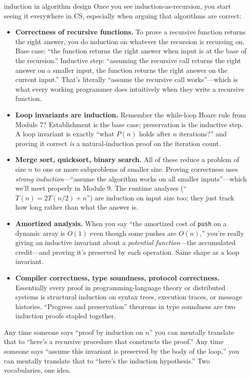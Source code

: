 \documentclass[11pt]{article}
\begin{document}
\begin{sidebar}{induction in algorithm design}
Once you see induction-as-recursion, you start seeing it everywhere in CS, especially when arguing that algorithms are correct:

\begin{itemize}
  \item \textbf{Correctness of recursive functions.} To prove a recursive function returns the right answer, you do induction on whatever the recursion is recursing on. Base case: ``the function returns the right answer when input is at the base of the recursion.'' Inductive step: ``assuming the recursive call returns the right answer on a smaller input, the function returns the right answer on the current input.'' That's literally ``assume the recursive call works''---which is what every working programmer does intuitively when they write a recursive function.
  \item \textbf{Loop invariants are induction.} Remember the while-loop Hoare rule from Module 7? Establishment is the base case; preservation is the inductive step. A loop invariant is exactly ``what $P(n)$ holds after $n$ iterations?'' and proving it correct \emph{is} a natural-induction proof on the iteration count.
  \item \textbf{Merge sort, quicksort, binary search.} All of these reduce a problem of size $n$ to one or more subproblems of smaller size. Proving correctness uses \emph{strong induction}---``assume the algorithm works on all smaller inputs''---which we'll meet properly in Module 9. The runtime analyses (``$T(n) = 2T(n/2) + n$'') are induction on input size too; they just track how long rather than what the answer is.
  \item \textbf{Amortized analysis.} When you say ``the amortized cost of \texttt{push} on a dynamic array is $O(1)$ even though some pushes are $O(n)$,'' you're really giving an inductive invariant about a \emph{potential function}---the accumulated credit---and proving it's preserved by each operation. Same shape as a loop invariant.
  \item \textbf{Compiler correctness, type soundness, protocol correctness.} Essentially every proof in programming-language theory or distributed systems is structural induction on syntax trees, execution traces, or message histories. ``Progress and preservation'' theorems in type soundness are two induction proofs stapled together.
\end{itemize}

Any time someone says ``proof by induction on $n$'' you can mentally translate that to ``here's a recursive procedure that constructs the proof.'' Any time someone says ``assume this invariant is preserved by the body of the loop,'' you can mentally translate that to ``here's the induction hypothesis.'' Two vocabularies, one idea.
\end{sidebar}
\end{document}
